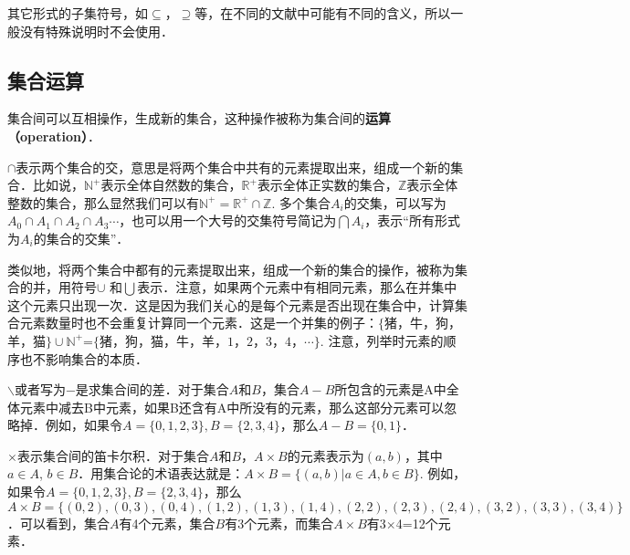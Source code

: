 其它形式的子集符号，如$⊆$，$\supseteq$等，在不同的文献中可能有不同的含义，所以一般没有特殊说明时不会使用．


\subsection{集合运算}

集合间可以互相操作，生成新的集合，这种操作被称为集合间的\textbf{运算（operation）}．

$∩$表示两个集合的交，意思是将两个集合中共有的元素提取出来，组成一个新的集合．比如说，$\mathbb{N^+}$表示全体自然数的集合，$\mathbb{R^+}$表示全体正实数的集合，$\mathbb{Z}$表示全体整数的集合，那么显然我们可以有$\mathbb{N^+}=\mathbb{R^+}∩\mathbb{Z}$. 多个集合$A_i$的交集，可以写为$A_0∩A_1∩A_2∩A_3⋯$，也可以用一个大号的交集符号简记为$⋂A_i$，表示“所有形式为$A_i$的集合的交集”．

类似地，将两个集合中都有的元素提取出来，组成一个新的集合的操作，被称为集合的并，用符号$∪$ 和$⋃$表示．注意，如果两个元素中有相同元素，那么在并集中这个元素只出现一次．这是因为我们关心的是每个元素是否出现在集合中，计算集合元素数量时也不会重复计算同一个元素．这是一个并集的例子：$\{$猪，牛，狗，羊，猫$\}∪\mathbb{N^+}$=$\{\text{猪，狗，猫，牛，羊}， 1，2，3，4，⋯\}$. 注意，列举时元素的顺序也不影响集合的本质．

$\backslash$或者写为$-$是求集合间的差．对于集合$A$和$B$，集合$A-B$所包含的元素是A中全体元素中减去B中元素，如果B还含有A中所没有的元素，那么这部分元素可以忽略掉．例如，如果令$A=\{0,1,2,3\}, B=\{2,3,4\}$，那么$A-B=\{0,1\}$．

$×$表示集合间的笛卡尔积．对于集合$A$和$B$，$A× B$的元素表示为$(a,b)$，其中$a∈ A$, $b∈ B$．用集合论的术语表达就是：$A× B=\{(a,b)|a∈ A, b∈ B\}$. 例如，如果令$A=\{0,1,2,3\}, B=\{2,3,4\}$，那么$A× B=\{ (0,2),(0,3),(0,4),(1,2),(1,3),(1,4),(2,2),(2,3),(2,4),(3,2),(3,3),(3,4) \}$．可以看到，集合$A$有4个元素，集合$B$有3个元素，而集合$A\times B$有3$\times$4=12个元素．

